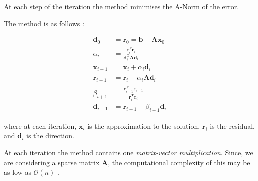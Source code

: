 At each step of the iteration the method minimises the A-Norm of the error.

The method is as follows \cite{cg-without-pain}:

\begin{align}
\mathbf{d}_0 &= \mathbf{r}_0 = \mathbf{b} - \mathbf{A}\mathbf{x}_0 \\
\alpha_i &= \frac{\mathbf{r}_i^{\mathbf{T}}\mathbf{r}_i}{\mathbf{d}_i^{\mathbf{T}}\mathbf{A}\mathbf{d}_i} \\
\mathbf{x}_{i+1} &= \mathbf{x}_i + \alpha_i \mathbf{d}_i \\
\mathbf{r}_{i+1} &= \mathbf{r}_i - \alpha_i \mathbf{A} \mathbf{d}_i \\
\beta_{i+1} &= \frac{\mathbf{r}_{i+1}^\mathbf{T} \mathbf{r}_{i+1}}{\mathbf{r}_{i}^\mathbf{T} \mathbf{r}_{i}} \\
\mathbf{d}_{i+1} &= \mathbf{r}_{i+1} + \beta_{i+1}\mathbf{d}_i
\end{align}

where at each iteration, $\mathbf{x}_i$ is the approximation to the solution, $\mathbf{r}_i$ is the residual, and $\mathbf{d}_i$ is the direction. 

At each iteration the method contains one \emph{matrix-vector multiplication}. Since, we are considering a sparse matrix $\mathbf{A}$, the computational complexity of this may be as low as $\mathcal{O}(n)$ \cite{numerical-linear-algebra}.












